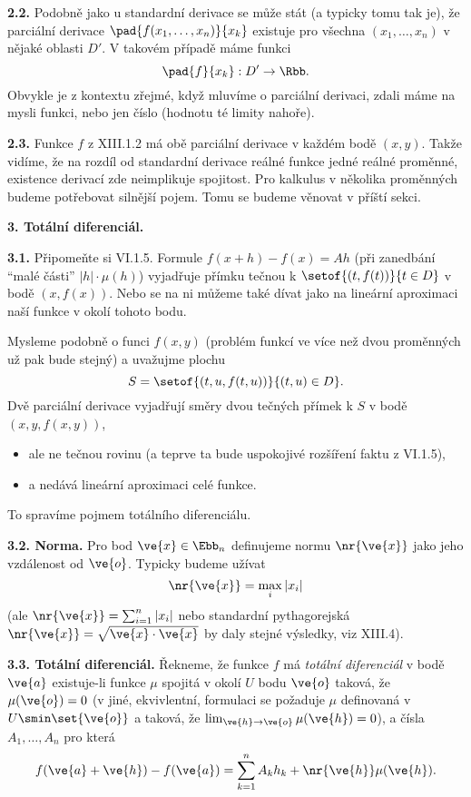 \documentclass[12pt]{article}
\begin{document}
{{\bf 2.2.} Podobně jako u standardní derivace se může stát (a typicky tomu tak je), že parciální derivace 
$\pad{f(x_1,\dots,x_n)}{x_k}$ existuje pro všechna $(x_1,\dots,x_n)$ v nějaké oblasti
$D'$. V takovém případě máme funkci
$$ 
\pad{f}{x_k}:D'\to\Rbb.
$$
Obvykle je z kontextu zřejmé,  když mluvíme o parciální derivaci, zdali máme na mysli funkci, nebo jen číslo  (hodnotu té limity nahoře).

\bigskip

{\bf 2.3.} Funkce $f$ z XIII.1.2 má obě parciální derivace v každém bodě $(x,y)$. Takže vidíme, že na rozdíl od standardní derivace reálné funkce jedné reálné proměnné, existence derivací zde neimplikuje spojitost. Pro kalkulus v několika proměnných budeme potřebovat silnější pojem. Tomu se budeme věnovat v příští sekci.



\vskip10mm
 
  
 {\large\bf 3. Totální diferenciál.}
 
 \bigskip
 


{\bf 3.1.}  Připomeňte si  VI.1.5. Formule $f(x+h)-f(x)=Ah$ (při zanedbání ``malé části'' $|h|\cdot\mu(h)$)
vyjadřuje přímku tečnou k $\setof{(t,f(t))}{t\in D}$ v bodě $(x,f(x))$. Nebo se na ni můžeme také dívat jako na lineární aproximaci naší funkce v okolí tohoto bodu.

Mysleme podobně o funci $f(x,y)$  (problém funkcí ve více než dvou proměnných už pak bude stejný) a uvažujme plochu 
$$
S=\setof{(t,u,f(t,u))}{(t,u)\in D}.
$$
Dvě parciální derivace vyjadřují směry dvou  tečných přímek k $S$ v bodě $(x,y,f(x,y))$, 
\begin{itemize}
\item ale ne tečnou rovinu (a teprve ta bude uspokojivé rozšíření faktu z VI.1.5),
\item a nedává lineární aproximaci celé funkce.
\end{itemize}
To spravíme pojmem totálního diferenciálu.

\bigskip

{\bf 3.2. Norma.} Pro bod $\ve{x}\in\Ebb_n$ definujeme normu $\nr{\ve{x}}$ jako jeho vzdálenost 
od $\ve{o}$. Typicky budeme užívat
$$
\nr{\ve{x}}=\max_i|x_i|
$$
(ale $\nr{\ve{x}}=\sum_{i=1}^n|x_i|$ nebo standardní pythagorejská $\nr{\ve{x}}=\sqrt{{\ve{x}}\cdot{\ve{x}}}$ by daly stejné výsledky, viz XIII.4).

\bigskip

{\bf 3.3. Totální diferenciál.} Řekneme, že funkce $f$ má {\em totální diferenciál} v bodě  $\ve{a}$ existuje-li funkce $\mu$ spojitá v okolí
 $U$ bodu  $\ve{o}$ taková, že $\mu(\ve{o})=0$ 
(v jiné, ekvivlentní, formulaci se požaduje $\mu$ definovaná v
$U\smin\set{\ve{o}}$ 
a taková, že $\lim_{\ve{h}\to\ve{o}}\mu(\ve{h})=0$),
a čísla $A_1,\dots,A_n$ pro která
$$
f(\ve{a}+\ve{h})-f(\ve{a})=\sum_{k=1}^nA_kh_k+\nr{\ve{h}}\mu(\ve{h}) .
$$

}
\end{document}
